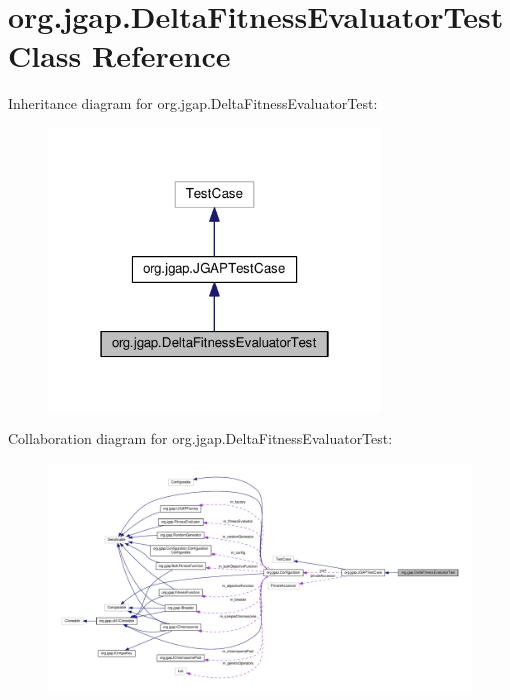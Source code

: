 \hypertarget{classorg_1_1jgap_1_1_delta_fitness_evaluator_test}{\section{org.\-jgap.\-Delta\-Fitness\-Evaluator\-Test Class Reference}
\label{classorg_1_1jgap_1_1_delta_fitness_evaluator_test}
}


Inheritance diagram for org.\-jgap.\-Delta\-Fitness\-Evaluator\-Test\-:
\nopagebreak
\begin{figure}[H]
\begin{center}
\leavevmode
\includegraphics[width=250pt]{classorg_1_1jgap_1_1_delta_fitness_evaluator_test__inherit__graph}
\end{center}
\end{figure}


Collaboration diagram for org.\-jgap.\-Delta\-Fitness\-Evaluator\-Test\-:
\nopagebreak
\begin{figure}[H]
\begin{center}
\leavevmode
\includegraphics[width=350pt]{classorg_1_1jgap_1_1_delta_fitness_evaluator_test__coll__graph}
\end{center}
\end{figure}
